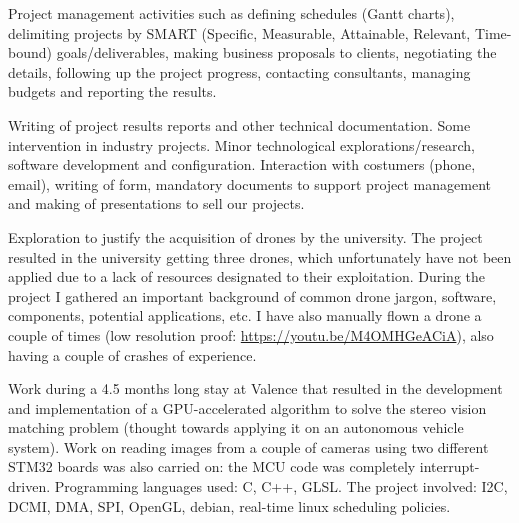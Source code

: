 \documentclass[helvetica,english,logo,notitle,totpages,utf8]{europecv2013}
\begin{document}

\begin{europecv}
\ecvpersonalinfo[10pt]




{
Project management activities such as defining schedules (Gantt charts), delimiting projects by SMART (Specific, Measurable, Attainable, Relevant, Time-bound) goals/deliverables, making business proposals to clients, negotiating the details, following up the project progress, contacting consultants, managing budgets and reporting the results.
}

{
Writing of project results reports and other technical documentation. Some intervention in industry projects. Minor technological explorations/research, software development and configuration. Interaction with costumers (phone, email), writing of form, mandatory documents to support project management and making of presentations to sell our projects.
}

{
Exploration to justify the acquisition of drones by the university. The project resulted in the university getting three drones, which unfortunately have not been applied due to a lack of resources designated to their exploitation. During the project I gathered an important background of common drone jargon, software, components, potential applications, etc. I have also manually flown a drone a couple of times (low resolution proof: \href{https://youtu.be/M4OMHGeACiA}{https://youtu.be/M4OMHGeACiA}), also having a couple of crashes of experience.
}

{
Work during a 4.5 months long stay at Valence that resulted in the development and implementation of a GPU-accelerated algorithm to solve the stereo vision matching problem (thought towards applying it on an autonomous vehicle system). Work on reading images from a couple of cameras using two different STM32 boards was also carried on: the MCU code was completely interrupt-driven. Programming languages used: C, C++, GLSL. The project involved: I2C, DCMI, DMA, SPI, OpenGL, debian, real-time linux scheduling policies.
}


\end{europecv}
\end{document}
